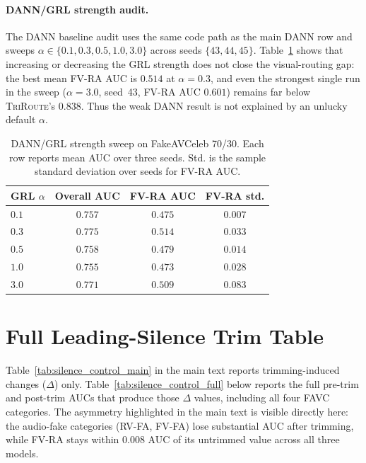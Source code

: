 \documentclass{article}
\newcommand{\method}{\textsc{TriRoute}}
\begin{document}
\paragraph{DANN/GRL strength audit.}
The DANN baseline audit uses the same code path as the main DANN row and sweeps $\alpha \in \{0.1,0.3,0.5,1.0,3.0\}$ across seeds $\{43,44,45\}$. Table~\ref{tab:dann_alpha_sweep} shows that increasing or decreasing the GRL strength does not close the visual-routing gap: the best mean FV-RA AUC is $0.514$ at $\alpha=0.3$, and even the strongest single run in the sweep ($\alpha=3.0$, seed~43, FV-RA AUC $0.601$) remains far below \method's $0.838$. Thus the weak DANN result is not explained by an unlucky default $\alpha$.

\begin{table}[h]
    \centering
    \caption{DANN/GRL strength sweep on FakeAVCeleb 70/30. Each row reports mean AUC over three seeds. Std. is the sample standard deviation over seeds for FV-RA AUC.}
    \label{tab:dann_alpha_sweep}
    \small
    \begin{tabular}{lccc}
        \toprule
        GRL $\alpha$ & Overall AUC & \textbf{FV-RA AUC} & FV-RA std. \\
        \midrule
        $0.1$ & $0.757$ & $0.475$ & $0.007$ \\
        $0.3$ & $\mathbf{0.775}$ & $\mathbf{0.514}$ & $0.033$ \\
        $0.5$ & $0.758$ & $0.479$ & $0.014$ \\
        $1.0$ & $0.755$ & $0.473$ & $0.028$ \\
        $3.0$ & $0.771$ & $0.509$ & $0.083$ \\
        \bottomrule
    \end{tabular}
\end{table}

\section{Full Leading-Silence Trim Table}
\label{app:silence_full}

Table~\ref{tab:silence_control_main} in the main text reports trimming-induced changes ($\Delta$) only. Table~\ref{tab:silence_control_full} below reports the full pre-trim and post-trim AUCs that produce those $\Delta$ values, including all four FAVC categories. The asymmetry highlighted in the main text is visible directly here: the audio-fake categories (RV-FA, FV-FA) lose substantial AUC after trimming, while FV-RA stays within $0.008$ AUC of its untrimmed value across all three models.
\end{document}
